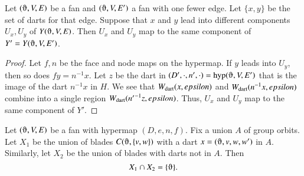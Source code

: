 %
%

\begin{lemma}
Let $(\orgn,V,E)$ be a fan and $(\orgn,V,E')$
a fan with one fewer edge.  Let  $\{x,y\}$ be the set of darts
for that  edge.
Suppose that $x$ and $y$ lead into different components $U_x,U_y$
of $Y(\orgn,V,E)$.
Then $U_x$ and $U_y$ map to the same component of $Y'=Y(\orgn,V,E')$.
\end{lemma}

\begin{proof}
Let $f,n$ be the face and node maps on the hypermap.
If $y$ leads into $U_y$, then so does
$f y = n^{-1} x$.  Let $z$ be the dart in
$(D',\cdot,n',\cdot)=\op{hyp}(\orgn,V,E')$ that is the image of the dart $n^{-1}x$
in $H$. We see that
$W_{\text{dart}}(x,epsilon)$ and $W_{\text{dart}}(n^{-1} x,epsilon)$ combine into a single
region $W_{\text{dart}}({n'}^{-1}z,epsilon)$.  Thus, $U_x$ and $U_y$ map to the
same component of $Y'$.
\end{proof}

\begin{lemma}
Let $(\orgn,V,E)$ be a fan with hypermap 
$(D,e,n,f)$.
Fix a union $A$ of group orbits.
Let $X_1$ be
the union of blades $C(\orgn,{\{v,w\}})$ with a dart 
$x =
(\orgn,v,w,w')$ in $A$.  Similarly, 
let $X_2$ be the union of blades with darts
not in $A$.  
Then $$X_1\cap X_2 = \{\orgn\}.$$
\end{lemma}

